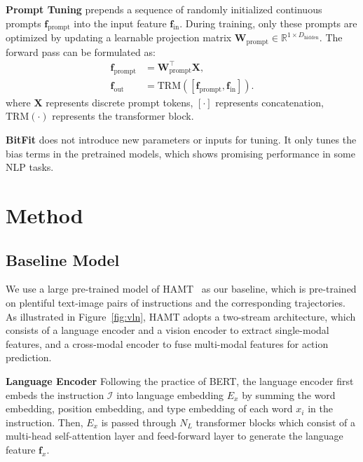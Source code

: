 \documentclass[10pt,twocolumn,letterpaper]{article}
\def\vf{{\bm{f}}}
\def\mW{{\bm{W}}}
\def\mX{{\bm{X}}}
\def\sR{{\mathbb{R}}}
\begin{document}
\noindent\textbf{Prompt Tuning} prepends a sequence of randomly initialized continuous prompts $\vf_{\text{prompt}}$ into the input feature $\vf_\text{in}$. During training, only these prompts are optimized by updating a learnable projection matrix $\mW_\text{prompt}\in\sR^{1 \times D_{\text{hidden}}}$. The forward pass can be formulated as:
\begin{align}
\vf_{\text{prompt}} &= \mW_\text{prompt}^\intercal\mX, \\
\vf_{\text{out}} &= \text{TRM}([\vf_{\text{prompt}},\vf_{\text{in}}]).
\end{align}
where $\mX$ represents discrete prompt tokens, $[\cdot]$ represents concatenation, $\text{TRM}(\cdot)$ represents the transformer block.



\noindent\textbf{BitFit} does not introduce new parameters or inputs for tuning. It only tunes the bias terms in the pretrained models, which shows promising performance in some NLP tasks. 


\section{Method}
\vspace{-3pt}
\subsection{Baseline Model}
\label{sec:transformer_model}
\vspace{-5pt}
We use a large pre-trained model of HAMT~\cite{hamt} as our baseline, which is pre-trained on plentiful text-image pairs of instructions and the corresponding trajectories.
As illustrated in Figure~\ref{fig:vln}, HAMT adopts a two-stream architecture, which consists of a language encoder and a vision encoder to extract single-modal features, and a cross-modal encoder to fuse multi-modal features for action prediction.  

\noindent\textbf{Language Encoder} Following the practice of BERT, the language encoder first embeds the instruction $\mathcal{I}$ into language embedding $E_{x}$ by summing the word embedding, position embedding, and type embedding of each word $x_i$ in the instruction. Then, $E_{x}$ is passed through $N_L$ transformer blocks which consist of a multi-head self-attention layer and feed-forward layer to generate the language feature $\vf_x$.
\end{document}
